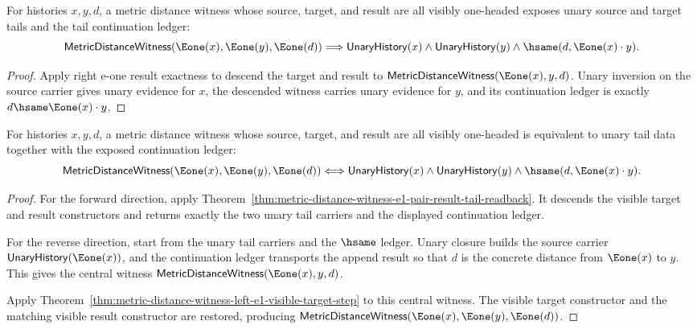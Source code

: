 \begin{theorem}
\label{thm:metric-distance-witness-e1-pair-result-tail-readback}
For histories $x,y,d$, a metric distance witness whose source, target, and
result are all visibly one-headed exposes unary source and target tails and the
tail continuation ledger:
$$
\mathsf{MetricDistanceWitness}(\Eone(x),\Eone(y),\Eone(d))
\Longrightarrow
\mathsf{UnaryHistory}(x)\land\mathsf{UnaryHistory}(y)\land
\hsame(d,\Eone(x)\cdot y).
$$
\end{theorem}
\begin{proof}
Apply right e-one result exactness to descend the target and result to
$\mathsf{MetricDistanceWitness}(\Eone(x),y,d)$. Unary inversion on the source
carrier gives unary evidence for $x$, the descended witness carries unary
evidence for $y$, and its continuation ledger is exactly
$d\hsame \Eone(x)\cdot y$.
\end{proof}

\begin{theorem}
\label{thm:metric-distance-witness-e1-pair-result-iff}
For histories $x,y,d$, a metric distance witness whose source, target, and
result are all visibly one-headed is equivalent to unary tail data together
with the exposed continuation ledger:
$$
\mathsf{MetricDistanceWitness}(\Eone(x),\Eone(y),\Eone(d))
\Longleftrightarrow
\mathsf{UnaryHistory}(x)\land\mathsf{UnaryHistory}(y)\land
\hsame(d,\Eone(x)\cdot y).
$$
\end{theorem}
\begin{proof}
For the forward direction, apply
Theorem~\ref{thm:metric-distance-witness-e1-pair-result-tail-readback}. It
descends the visible target and result constructors and returns exactly the
two unary tail carriers and the displayed continuation ledger.

For the reverse direction, start from the unary tail carriers and the
$\hsame$ ledger. Unary closure builds the source carrier
$\mathsf{UnaryHistory}(\Eone(x))$, and the continuation ledger transports the
append result so that $d$ is the concrete distance from $\Eone(x)$ to $y$.
This gives the central witness
$\mathsf{MetricDistanceWitness}(\Eone(x),y,d)$.

Apply
Theorem~\ref{thm:metric-distance-witness-left-e1-visible-target-step} to this
central witness. The visible target constructor and the matching visible
result constructor are restored, producing
$\mathsf{MetricDistanceWitness}(\Eone(x),\Eone(y),\Eone(d))$.
\end{proof}

